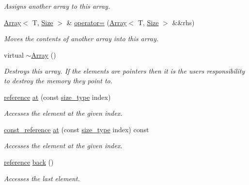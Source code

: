 \begin{DoxyCompactItemize}
\begin{DoxyCompactList}\small\item\em Assigns another array to this array. \end{DoxyCompactList}\item 
\hyperlink{classprism_1_1_array}{Array}$<$ T, \hyperlink{classprism_1_1_size}{Size} $>$ \& \hyperlink{classprism_1_1_array_a8a943dfd330b23b5514441ba9cd24354}{operator=} (\hyperlink{classprism_1_1_array}{Array}$<$ T, \hyperlink{classprism_1_1_size}{Size} $>$ \&\&rhs)
\begin{DoxyCompactList}\small\item\em Moves the contents of another array into this array. \end{DoxyCompactList}\item 
virtual \hyperlink{classprism_1_1_array_a6b2cca8acf9276ac8087b73ccd91d51f}{$\sim$\+Array} ()
\begin{DoxyCompactList}\small\item\em Destroys this array. If the elements are pointers then it is the user\textquotesingle{}s responsibility to destroy the memory they point to. \end{DoxyCompactList}\item 
\hyperlink{classprism_1_1_array_a00d78e61fb0a47489aff55b88ae9ebaa}{reference} \hyperlink{classprism_1_1_array_ab45794e68a66b0e7e53e900b3d8facf7}{at} (const \hyperlink{classprism_1_1_array_a91c89205e41d0e7825562343bfde3f1b}{size\+\_\+type} index)
\begin{DoxyCompactList}\small\item\em Accesses the element at the given index. \end{DoxyCompactList}\item 
\hyperlink{classprism_1_1_array_a16161ca6c0027dfa1a7c678e820eedc3}{const\+\_\+reference} \hyperlink{classprism_1_1_array_af4ac3b4fbbd880595215a4c420c05bc0}{at} (const \hyperlink{classprism_1_1_array_a91c89205e41d0e7825562343bfde3f1b}{size\+\_\+type} index) const 
\begin{DoxyCompactList}\small\item\em Accesses the element at the given index. \end{DoxyCompactList}\item 
\hyperlink{classprism_1_1_array_a00d78e61fb0a47489aff55b88ae9ebaa}{reference} \hyperlink{classprism_1_1_array_a52bf53de7bf1f19277aa61ff308c5c22}{back} ()
\begin{DoxyCompactList}\small\item\em Accesses the last element. \end{DoxyCompactList}\item 

\end{DoxyCompactItemize}
